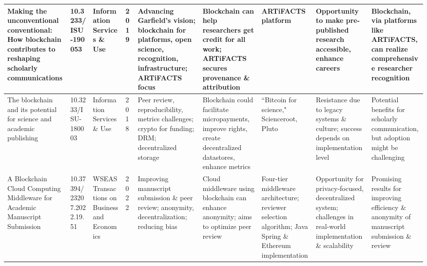 \documentclass{article}
\begin{document}
\begin{landscape}
\begin{table}[ht]
\begin{tabularx}{\linewidth}{|p{3.5cm}|p{2.5cm}|p{3cm}|p{1.8cm}|X|X|X|X|X|}
            \hline
            Making the unconventional conventional: How blockchain contributes to reshaping scholarly communications                           & 10.3233/ISU-190053            & Information Services \& Use                                    & 2019                      & Advancing Garfield's vision; blockchain for platforms, open science, recognition, infrastructure; ARTiFACTS focus           & Blockchain can help researchers get credit for all work; ARTiFACTS secures provenance \& attribution                                           & ARTiFACTS platform                                                                                      & Opportunity to make pre-published research accessible, enhance careers                                                              & Blockchain, via platforms like ARTiFACTS, can realize comprehensive researcher recognition            \\
            \hline
            The blockchain and its potential for science and academic publishing                                                               & 10.3233/ISU-180003            & Information Services \& Use                                    & 2018                      & Peer review, reproducibility, metrics challenges; crypto for funding; DRM; decentralized storage                            & Blockchain could facilitate micropayments, improve rights, create decentralized datastores, enhance metrics                                    & ``Bitcoin for science," Scienceroot, Pluto                                                              & Resistance due to legacy systems \& culture; success depends on implementation level                                                & Potential benefits for scholarly communication, but adoption might be challenging                     \\
            \hline
            A Blockchain Cloud Computing Middleware for Academic Manuscript Submission                                                         & 10.37394/23207.2022.19.51     & WSEAS Transactions on Business and Economics                   & 2022                      & Improving manuscript submission \& peer review; anonymity, decentralization; reducing bias                                  & Cloud middleware using blockchain can enhance anonymity; aims to optimize peer review                                                          & Four-tier middleware architecture; reviewer selection algorithm; Java Spring \& Ethereum implementation & Opportunity for privacy-focused, decentralized system; challenges in real-world implementation \& scalability                       & Promising results for improving efficiency \& anonymity of manuscript submission \& review            \\

\end{tabularx}
\end{table}
\end{landscape}
\end{document}

